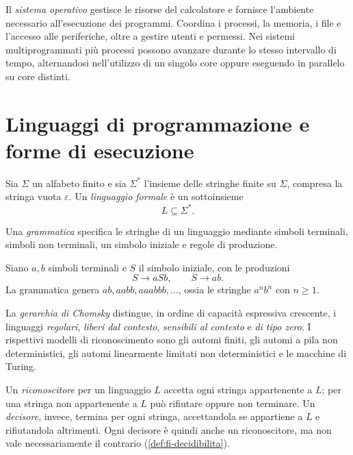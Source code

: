 Il \emph{sistema operativo} gestisce le risorse del calcolatore
e fornisce l'ambiente necessario all'esecuzione dei programmi.
Coordina i processi, la memoria, i file e l'accesso alle periferiche,
oltre a gestire utenti e permessi. Nei sistemi multiprogrammati
più processi possono avanzare durante lo stesso intervallo di tempo,
alternandosi nell'utilizzo di un singolo core oppure eseguendo
in parallelo su core distinti.

\section{Linguaggi di programmazione e forme di esecuzione}
\label{sec:fi-linguaggi-esecuzione}

\begin{definition}
\label{def:fi-linguaggio-formale}
Sia \(\Sigma\) un alfabeto finito e sia \(\Sigma^*\) l'insieme
delle stringhe finite su \(\Sigma\), compresa la stringa vuota
\(\varepsilon\). Un \emph{linguaggio formale} è un sottoinsieme
\[
  L\subseteq\Sigma^*.
\]
\end{definition}

Una \emph{grammatica} specifica le stringhe di un linguaggio mediante
simboli terminali, simboli non terminali, un simbolo iniziale e
regole di produzione.

\clearpage

\begin{example}
Siano \(a,b\) simboli terminali e \(S\) il simbolo iniziale,
con le produzioni
\[
  S\to aSb,\qquad S\to ab.
\]
La grammatica genera \(ab,aabb,aaabbb,\ldots\), ossia le stringhe
\(a^nb^n\) con \(n\ge1\).
\end{example}

La \emph{gerarchia di Chomsky} distingue, in ordine di capacità
espressiva crescente, i linguaggi \emph{regolari}, \emph{liberi dal
contesto}, \emph{sensibili al contesto} e \emph{di tipo zero}.
I rispettivi modelli di riconoscimento sono gli automi finiti,
gli automi a pila non deterministici, gli automi linearmente
limitati non deterministici e le macchine di Turing.

Un \emph{riconoscitore} per un linguaggio \(L\) accetta ogni stringa
appartenente a \(L\); per una stringa non appartenente a \(L\)
può rifiutare oppure non terminare. Un \emph{decisore}, invece,
termina per ogni stringa, accettandola se appartiene a \(L\)
e rifiutandola altrimenti. Ogni decisore è quindi anche un
riconoscitore, ma non vale necessariamente il contrario
(\cref{def:fi-decidibilita}).

